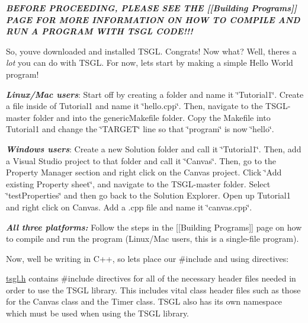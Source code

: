 {\itshape {\bfseries{B\+E\+F\+O\+RE P\+R\+O\+C\+E\+E\+D\+I\+NG, P\+L\+E\+A\+SE S\+EE T\+HE \mbox{[}\mbox{[}Building Programs\mbox{]}\mbox{]} P\+A\+GE F\+OR M\+O\+RE I\+N\+F\+O\+R\+M\+A\+T\+I\+ON ON H\+OW TO C\+O\+M\+P\+I\+LE A\+ND R\+UN A P\+R\+O\+G\+R\+AM W\+I\+TH T\+S\+GL C\+O\+D\+E!!!}}}

So, you\textquotesingle{}ve downloaded and installed T\+S\+GL. Congrats! Now what? Well, there\textquotesingle{}s a {\itshape lot} you can do with T\+S\+GL. For now, let\textquotesingle{}s start by making a simple Hello World program!

{\itshape {\bfseries{Linux/\+Mac users}}}\+: Start off by creating a folder and name it \char`\"{}\+Tutorial1\char`\"{}. Create a file inside of Tutorial1 and name it \char`\"{}hello.\+cpp\char`\"{}. Then, navigate to the T\+S\+G\+L-\/master folder and into the generic\+Makefile folder. Copy the Makefile into Tutorial1 and change the \char`\"{}\+T\+A\+R\+G\+E\+T\char`\"{} line so that \char`\"{}program\char`\"{} is now \char`\"{}hello\char`\"{}.

{\itshape {\bfseries{Windows users}}}\+: Create a new Solution folder and call it \char`\"{}\+Tutorial1\char`\"{}. Then, add a Visual Studio project to that folder and call it \char`\"{}\+Canvas\char`\"{}. Then, go to the Property Manager section and right click on the Canvas project. Click \char`\"{}\+Add existing Property sheet\char`\"{}, and navigate to the T\+S\+G\+L-\/master folder. Select \char`\"{}test\+Properties\char`\"{} and then go back to the Solution Explorer. Open up Tutorial1 and right click on Canvas. Add a .cpp file and name it \char`\"{}canvas.\+cpp\char`\"{}.

{\itshape {\bfseries{All three platforms\+:}}} Follow the steps in the \mbox{[}\mbox{[}Building Programs\mbox{]}\mbox{]} page on how to compile and run the program (Linux/\+Mac users, this is a single-\/file program).

Now, we\textquotesingle{}ll be writing in C++, so let\textquotesingle{}s place our \#include and using directives\+:


\begin{DoxyCode}{0}
\DoxyCodeLine{\textcolor{preprocessor}{\#include <tsgl.h>}}
\end{DoxyCode}


{\ttfamily \mbox{\hyperlink{tsgl_8h_source}{tsgl.\+h}}} contains \#include directives for all of the necessary header files needed in order to use the T\+S\+GL library. This includes vital class header files such as those for the Canvas class and the Timer class. T\+S\+GL also has its own namespace which must be used when using the T\+S\+GL library.


